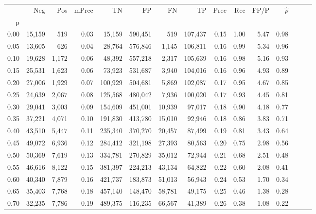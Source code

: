 \begin{tabular}{rrrrrrrrrrrrrrr}
\toprule
{} &     Neg &    Pos & mPrec &       TN &       FP &       FN &       TP &  Prec &   Rec &  FP/P & $\hat{p}$ \\
p    &         &        &       &          &          &          &          &       &       &       &           \\
\midrule
0.00 &  15,159 &    519 &  0.03 &   15,159 &  590,451 &      519 &  107,437 &  0.15 &  1.00 &  5.47 &      0.98 \\
0.05 &  13,605 &    626 &  0.04 &   28,764 &  576,846 &    1,145 &  106,811 &  0.16 &  0.99 &  5.34 &      0.96 \\
0.10 &  19,628 &  1,172 &  0.06 &   48,392 &  557,218 &    2,317 &  105,639 &  0.16 &  0.98 &  5.16 &      0.93 \\
0.15 &  25,531 &  1,623 &  0.06 &   73,923 &  531,687 &    3,940 &  104,016 &  0.16 &  0.96 &  4.93 &      0.89 \\
0.20 &  27,006 &  1,929 &  0.07 &  100,929 &  504,681 &    5,869 &  102,087 &  0.17 &  0.95 &  4.67 &      0.85 \\
0.25 &  24,639 &  2,067 &  0.08 &  125,568 &  480,042 &    7,936 &  100,020 &  0.17 &  0.93 &  4.45 &      0.81 \\
0.30 &  29,041 &  3,003 &  0.09 &  154,609 &  451,001 &   10,939 &   97,017 &  0.18 &  0.90 &  4.18 &      0.77 \\
0.35 &  37,221 &  4,071 &  0.10 &  191,830 &  413,780 &   15,010 &   92,946 &  0.18 &  0.86 &  3.83 &      0.71 \\
0.40 &  43,510 &  5,447 &  0.11 &  235,340 &  370,270 &   20,457 &   87,499 &  0.19 &  0.81 &  3.43 &      0.64 \\
0.45 &  49,072 &  6,936 &  0.12 &  284,412 &  321,198 &   27,393 &   80,563 &  0.20 &  0.75 &  2.98 &      0.56 \\
0.50 &  50,369 &  7,619 &  0.13 &  334,781 &  270,829 &   35,012 &   72,944 &  0.21 &  0.68 &  2.51 &      0.48 \\
0.55 &  46,616 &  8,122 &  0.15 &  381,397 &  224,213 &   43,134 &   64,822 &  0.22 &  0.60 &  2.08 &      0.41 \\
0.60 &  40,340 &  7,879 &  0.16 &  421,737 &  183,873 &   51,013 &   56,943 &  0.24 &  0.53 &  1.70 &      0.34 \\
0.65 &  35,403 &  7,768 &  0.18 &  457,140 &  148,470 &   58,781 &   49,175 &  0.25 &  0.46 &  1.38 &      0.28 \\
0.70 &  32,235 &  7,786 &  0.19 &  489,375 &  116,235 &   66,567 &   41,389 &  0.26 &  0.38 &  1.08 &      0.22 \\

\end{tabular}

